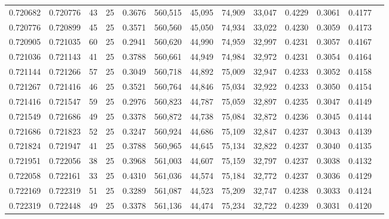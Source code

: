 \begin{tabular}{rrrrrrrrrrrrr}
0.720682 & 0.720776 &    43 &  25 &                                     0.3676 & 560,515 &  45,095 &  74,909 &  33,047 & 0.4229 & 0.3061 & 0.4177 \\
0.720776 & 0.720899 &    45 &  25 &                                     0.3571 & 560,560 &  45,050 &  74,934 &  33,022 & 0.4230 & 0.3059 & 0.4173 \\
0.720905 & 0.721035 &    60 &  25 &                                     0.2941 & 560,620 &  44,990 &  74,959 &  32,997 & 0.4231 & 0.3057 & 0.4167 \\
0.721036 & 0.721143 &    41 &  25 &                                     0.3788 & 560,661 &  44,949 &  74,984 &  32,972 & 0.4231 & 0.3054 & 0.4164 \\
0.721144 & 0.721266 &    57 &  25 &                                     0.3049 & 560,718 &  44,892 &  75,009 &  32,947 & 0.4233 & 0.3052 & 0.4158 \\
0.721267 & 0.721416 &    46 &  25 &                                     0.3521 & 560,764 &  44,846 &  75,034 &  32,922 & 0.4233 & 0.3050 & 0.4154 \\
0.721416 & 0.721547 &    59 &  25 &                                     0.2976 & 560,823 &  44,787 &  75,059 &  32,897 & 0.4235 & 0.3047 & 0.4149 \\
0.721549 & 0.721686 &    49 &  25 &                                     0.3378 & 560,872 &  44,738 &  75,084 &  32,872 & 0.4236 & 0.3045 & 0.4144 \\
0.721686 & 0.721823 &    52 &  25 &                                     0.3247 & 560,924 &  44,686 &  75,109 &  32,847 & 0.4237 & 0.3043 & 0.4139 \\
0.721824 & 0.721947 &    41 &  25 &                                     0.3788 & 560,965 &  44,645 &  75,134 &  32,822 & 0.4237 & 0.3040 & 0.4135 \\
0.721951 & 0.722056 &    38 &  25 &                                     0.3968 & 561,003 &  44,607 &  75,159 &  32,797 & 0.4237 & 0.3038 & 0.4132 \\
0.722058 & 0.722161 &    33 &  25 &                                     0.4310 & 561,036 &  44,574 &  75,184 &  32,772 & 0.4237 & 0.3036 & 0.4129 \\
0.722169 & 0.722319 &    51 &  25 &                                     0.3289 & 561,087 &  44,523 &  75,209 &  32,747 & 0.4238 & 0.3033 & 0.4124 \\
0.722319 & 0.722448 &    49 &  25 &                                     0.3378 & 561,136 &  44,474 &  75,234 &  32,722 & 0.4239 & 0.3031 & 0.4120 \\

\end{tabular}
